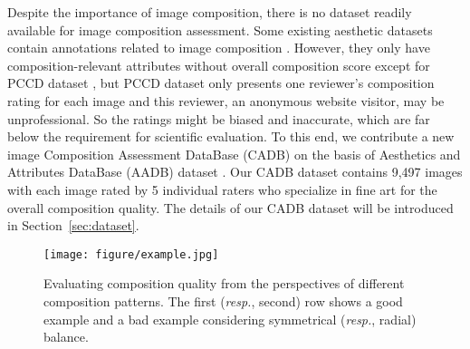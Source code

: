 \documentclass{bmvc2k}
\begin{document}
Despite the importance of image composition, there is no dataset readily available for image composition assessment. Some existing aesthetic datasets contain annotations related to image composition \cite{Kong2016PhotoAR, Murray2012AVAAL, Jin2019AestheticAA, Chang2017AestheticCG}.
\textcolor[rgb]{0,0,0}{However, they only have composition-relevant attributes without overall composition score except for PCCD dataset \cite{Chang2017AestheticCG}, but PCCD dataset only presents one reviewer's composition rating for each image and this reviewer, an anonymous website visitor, may be unprofessional. So the ratings might be biased and inaccurate, which are far below the requirement for scientific evaluation.}
To this end, we contribute a new image Composition Assessment DataBase (CADB) on the basis of Aesthetics and Attributes DataBase (AADB) dataset \cite{Kong2016PhotoAR}. Our CADB dataset contains 9,497 images with each image rated by 5 individual raters who specialize in fine art for the overall composition quality. The details of our CADB dataset will be introduced in Section~\ref{sec:dataset}.



\begin{wrapfigure}{R}{0.5\linewidth}
  \vspace{-7mm}
  \begin{center}
    \texttt{[image: figure/example.jpg]}
  \end{center}
  \vspace{-6mm}
  \caption{Evaluating composition quality from the perspectives of different composition patterns. The first (\emph{resp.}, second) row shows a good example and a bad example considering symmetrical (\emph{resp.}, radial) balance.}
  \vspace{-2mm}
  \label{fig:pattern_example}
\end{wrapfigure}
\end{document}
